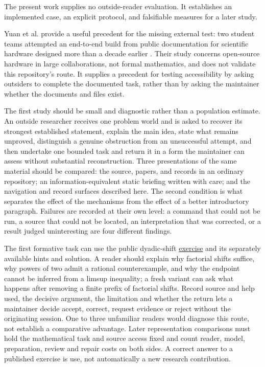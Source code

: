 \documentclass[10pt]{article}
\newcommand{\repobase}{https://github.com/wcook04/plectis-erdos}
\begin{document}
The present work supplies no outside-reader evaluation. It establishes an
implemented case, an explicit protocol, and falsifiable measures for a later
study.

Yuan et al. provide a useful precedent for the missing external test: two
student teams attempted an end-to-end build from public documentation for
scientific hardware designed more than a decade earlier
\cite{documentationtest}. Their study concerns open-source hardware in large
collaborations, not formal mathematics, and does not validate this repository's
route. It supplies a precedent for testing accessibility by asking outsiders
to complete the documented task, rather than by asking the maintainer whether
the documents and files exist.

The first study should be small and diagnostic rather than a population
estimate.  An outside researcher receives one problem world and is asked to
recover its strongest established statement, explain the main idea, state what
remains unproved, distinguish a genuine obstruction from an unsuccessful
attempt, and then undertake one bounded task and return it in a form the
maintainer can assess without substantial reconstruction.  Three presentations
of the same material should be compared: the source, papers, and records in an
ordinary repository; an information-equivalent static briefing written with
care; and the navigation and record surfaces described here.  The second
condition is what separates the effect of the mechanisms from the effect of a
better introductory paragraph.  Failures are recorded at their own level: a
command that could not be run, a source that could not be located, an
interpretation that was corrected, or a result judged uninteresting are four
different findings.

The first formative task can use the public dyadic-shift
\href{\repobase/blob/cf2bbe46/research/experiments/premise_exchange/shift_family_exercise.md}{exercise}
and its separately available hints and solution. A reader should explain why
factorial shifts suffice, why powers of two admit a rational counterexample,
and why the endpoint cannot be inferred from a limsup inequality; a fresh
variant can ask what happens after removing a finite prefix of factorial
shifts. Record source and help used, the decisive argument, the limitation and
whether the return lets a maintainer decide accept, correct, request evidence
or reject without the originating session. One to three unfamiliar readers
would diagnose this route, not establish a comparative advantage. Later
representation comparisons must hold the mathematical task and source access
fixed and count reader, model, preparation, review and repair costs on both
sides. A correct answer to a published exercise is use, not automatically a
new research contribution.
\end{document}

